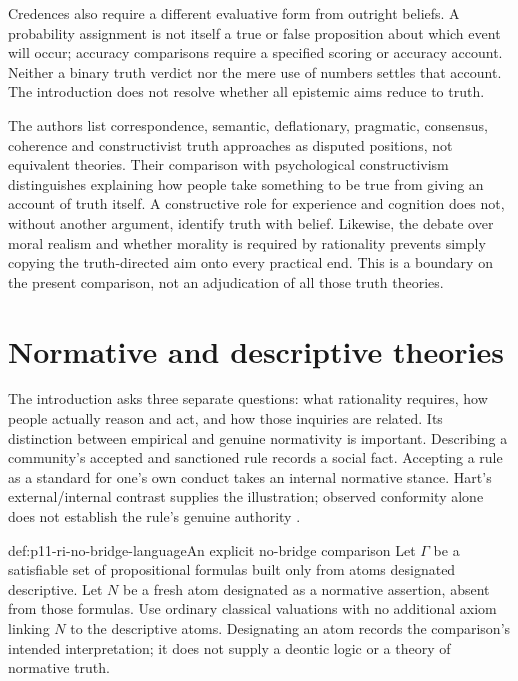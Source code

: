 Credences also require a different evaluative form from outright
beliefs. A probability assignment is not itself a true or false
proposition about which event will occur; accuracy comparisons require
a specified scoring or accuracy account. Neither a binary truth verdict
nor the mere use of numbers settles that account. The introduction
does not resolve whether all epistemic aims reduce to truth.

The authors list correspondence, semantic, deflationary, pragmatic,
consensus, coherence and constructivist truth approaches as disputed
positions, not equivalent theories. Their comparison with psychological
constructivism distinguishes explaining how people take something to
be true from giving an account of truth itself. A constructive role for
experience and cognition does not, without another argument, identify
truth with belief. Likewise, the debate over moral realism and whether
morality is required by rationality prevents simply copying the
truth-directed aim onto every practical end. This is a boundary on
the present comparison, not an adjudication of all those truth theories.

\section{Normative and descriptive theories}
\label{sec:p11-ri-normative-descriptive}

The introduction asks three separate questions: what rationality
requires, how people actually reason and act, and how those inquiries
are related. Its distinction between empirical and genuine normativity
is important. Describing a community's accepted and sanctioned rule
records a social fact. Accepting a rule as a standard for one's own
conduct takes an internal normative stance. Hart's external/internal
contrast supplies the illustration; observed conformity alone does
not establish the rule's genuine authority
\cite[pp.~18--21]{KnauffSpohn2021FrameworksIntro}.

\begin{hbdefinition}{def:p11-ri-no-bridge-language}{An explicit no-bridge comparison}
Let \(\Gamma\) be a satisfiable set of propositional formulas built
only from atoms designated descriptive. Let \(N\) be a fresh atom
designated as a normative assertion, absent from those formulas.
Use ordinary classical valuations with no additional axiom linking
\(N\) to the descriptive atoms. Designating an atom records the
comparison's intended interpretation; it does not supply a deontic
logic or a theory of normative truth.
\end{hbdefinition}

